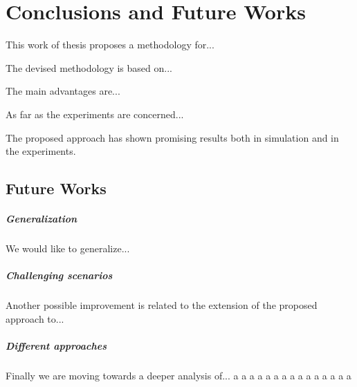 \chapter{Conclusions and Future Works}
\label{chap:Conclusions}
\pagestyle{plain}
\vspace{0.5cm}

\noindent

This work of thesis proposes a methodology for...

The devised methodology is based on...

The main advantages are...

As far as the experiments are concerned...

The proposed approach has shown promising results both in simulation and in the experiments.


\section{Future Works}

\paragraph{Generalization}
We would like to generalize...

\paragraph{Challenging scenarios}
Another possible improvement is related to the extension of the proposed approach to...

\paragraph{Different approaches}
Finally we are moving towards a deeper analysis of...
a
a
a
a
a
a
a
a
a
a
a
a
a
a
a
